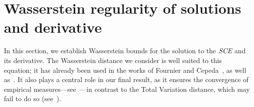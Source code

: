 \documentclass[11pt,a4paper]{article}
\newcommand{\RRP}{\mathbb{R}^+_*}
\newcommand{\SCE}{\emph{SCE}}
\newcommand{\red}[1]{\textcolor{red}{#1}}
\newcommand{\brac}[1]{\left\langle#1\right\rangle}
\newcommand{\dd}{\mathop{}\!\mathrm{d}}
\newtheorem{corollary}[theorem]{Corollary}
\begin{document}
\newpage
\section{Wasserstein regularity of solutions and derivative}\label{section:Wass-regularity}
In this section, we establish Wasserstein bounds for the solution to the $\SCE$ and its derivative. The Wasserstein distance we consider is well suited to this equation; it has already been used in the works of Fournier and Cepeda~\cite{cepedaSmoluchowskisEquationRate2011a}, as well as~\cite{fournier2004convergence,fournierDistanceCoagulation2006}. It also plays a central role in our final result, as it ensures the convergence of empirical measures—see~\cite{fournier2015rate}—in contrast to the Total Variation distance, which may fail to do so (see~\cite{devroye1990no}).
\end{document}
